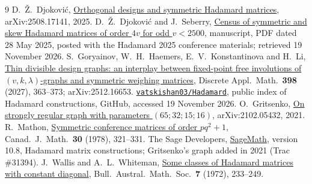 \documentclass[10pt]{article}
\begin{document}
\begin{footnotesize}
\begin{thebibliography}{9}
 D.~\v{Z}.~Djokovi\'c, \href{https://arxiv.org/abs/2508.17141}{Orthogonal designs and symmetric Hadamard matrices}, arXiv:2508.17141, 2025.
 D.~\v{Z}.~Djokovi\'c and J.~Seberry, \href{https://us.ticmeet.com/assets/archivos/d6f1d9b8-d39f-4888-925a-7eb81c4905cc/jenni-paper.pdf}{Census of symmetric and skew Hadamard matrices of order $4v$ for odd $v<2500$}, manuscript, PDF dated 28 May 2025, posted with the Hadamard 2025 conference materials; retrieved 19 November 2026.
 S.~Goryainov, W.~H.~Haemers, E.~V.~Konstantinova and H.~Li, \href{https://arxiv.org/abs/2512.16653}{Thin divisible design graphs: an interplay between fixed-point free involutions of $(v,k,\lambda)$-graphs and symmetric weighing matrices}, Discrete Appl.\ Math.\ \textbf{398} (2027), 363--373; arXiv:2512.16653.
 \href{https://github.com/vatskishan03/Hadamard}{\texttt{vatskishan03/Hadamard}}, public index of Hadamard constructions, GitHub, accessed 19 November 2026.
 O.~Gritsenko, \href{https://arxiv.org/abs/2102.05432}{On strongly regular graph with parameters $(65;32;15;16)$}, arXiv:2102.05432, 2021.
 R.~Mathon, \href{https://doi.org/10.4153/CJM-1978-029-1}{Symmetric conference matrices of order $pq^2+1$}, Canad.\ J.\ Math.\ \textbf{30} (1978), 321--331.
 The Sage Developers, \href{https://github.com/sagemath/sage/blob/981d7d71a2738778c9e3fb4fdf67a0fd3ce0c19c/src/sage/combinat/matrices/hadamard_matrix.py}{SageMath}, version 10.8, Hadamard matrix constructions; Gritsenko's graph added in 2021 (Trac \#31394).
 J.~Wallis and A.~L.~Whiteman, \href{https://doi.org/10.1017/S0004972700044993}{Some classes of Hadamard matrices with constant diagonal}, Bull.\ Austral.\ Math.\ Soc.\ \textbf{7} (1972), 233--249.
\end{thebibliography}
\end{footnotesize}
\end{document}
